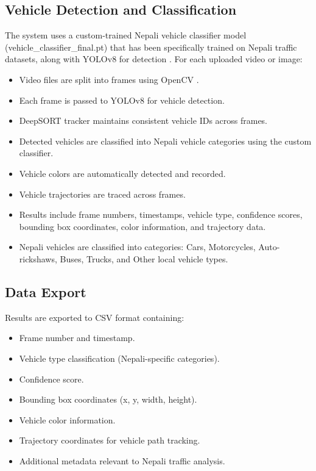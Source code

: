 \documentclass[12pt,a4paper]{report}
\begin{document}
\subsection{Vehicle Detection and Classification}
The system uses a custom-trained Nepali vehicle classifier model (vehicle\_classifier\_final.pt) that has been specifically trained on Nepali traffic datasets, along with YOLOv8 for detection \cite{redmon2016yolo, ultralytics2023yolov8}. For each uploaded video or image:
\begin{itemize}
    \item Video files are split into frames using OpenCV \cite{opencv2000the}.
    \item Each frame is passed to YOLOv8 for vehicle detection.
    \item DeepSORT tracker \cite{bewley2016deepsort} maintains consistent vehicle IDs across frames.
    \item Detected vehicles are classified into Nepali vehicle categories using the custom classifier.
    \item Vehicle colors are automatically detected and recorded.
    \item Vehicle trajectories are traced across frames.
    \item Results include frame numbers, timestamps, vehicle type, confidence scores, bounding box coordinates, color information, and trajectory data.
    \item Nepali vehicles are classified into categories: Cars, Motorcycles, Auto-rickshaws, Buses, Trucks, and Other local vehicle types.
\end{itemize}

\subsection{Data Export}
Results are exported to CSV format containing:
\begin{itemize}
    \item Frame number and timestamp.
    \item Vehicle type classification (Nepali-specific categories).
    \item Confidence score.
    \item Bounding box coordinates (x, y, width, height).
    \item Vehicle color information.
    \item Trajectory coordinates for vehicle path tracking.
    \item Additional metadata relevant to Nepali traffic analysis.
\end{itemize}
\end{document}
